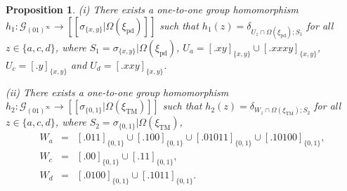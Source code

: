 \documentclass[12pt]{article}
\newtheorem{proposition}[theorem]{Proposition}
\theoremstyle{definition}
\def\cG{\mathcal{G}}
\def\de{\delta}
\def\si{\sigma}
\def\Om{\Omega}
\def\xiTM{\xi_{\mathrm{TM}}}
\def\xipd{\xi_{\mathrm{pd}}}
\begin{document}
\begin{proposition}\label{two-more-inj}
(i) There exists a one-to-one group homomorphism $h_1:\cG_{(01)^\infty}\to 
[[\si_{\{x,y\}}|\Om(\xipd)]]$ such that 
$h_1(z)=\de_{U_z\cap\Om(\xipd);S_1}$ for all $z\in\{a,c,d\}$, where 
$S_1=\si_{\{x,y\}}|\Om(\xipd)$, $U_a=[.xy]_{\{x,y\}}\cup [.xxxy]_{\{x,y\}}$,
$U_c=[.y]_{\{x,y\}}$ and $U_d=[.xxy]_{\{x,y\}}$.

(ii) There exists a one-to-one group homomorphism $h_2:\cG_{(01)^\infty}\to 
[[\si_{\{0,1\}}|\Om(\xiTM)]]$ such that 
$h_2(z)=\de_{W_z\cap\Om(\xiTM);S_2}$ for all $z\in\{a,c,d\}$, where 
$S_2=\si_{\{0,1\}}|\Om(\xiTM)$,
\begin{eqnarray*}
W_a &=& [.011]_{\{0,1\}}\cup [.100]_{\{0,1\}}\cup [.01011]_{\{0,1\}}\cup 
[.10100]_{\{0,1\}},\\
W_c &=& [.00]_{\{0,1\}}\cup [.11]_{\{0,1\}},\\
W_d &=& [.0100]_{\{0,1\}}\cup [.1011]_{\{0,1\}}.
\end{eqnarray*}
\end{proposition}
\end{document}
